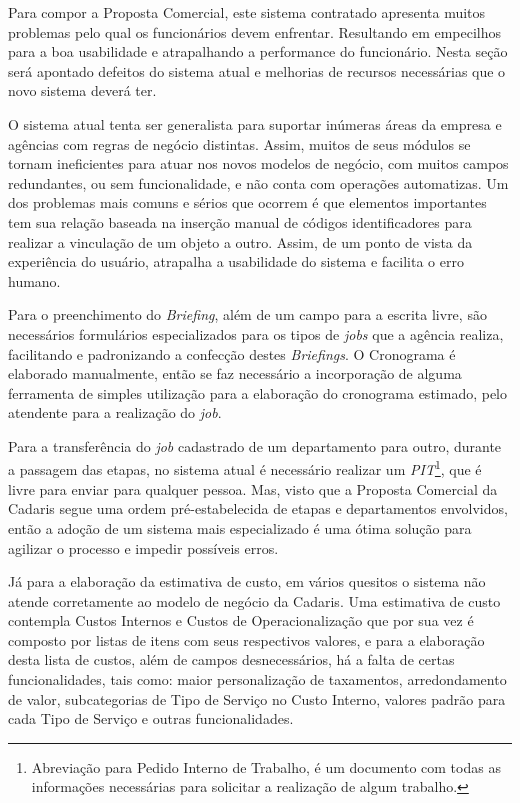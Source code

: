 \documentclass[
  12pt,				%
  openany,
  oneside,
  a4paper,			%
  english,			%
  brazil
]{article}
\numberwithin{figure}{section}
\numberwithin{table}{section}
\begin{document}
Para compor a Proposta Comercial, este sistema contratado apresenta muitos problemas pelo qual os funcionários devem enfrentar. Resultando em empecilhos para a boa usabilidade e atrapalhando a performance do funcionário. Nesta seção será apontado defeitos do sistema atual e melhorias de recursos necessárias que o novo sistema deverá ter.

O sistema atual tenta ser generalista para suportar inúmeras áreas da empresa e agências com regras de negócio distintas. Assim, muitos de seus módulos se tornam ineficientes para atuar nos novos modelos de negócio, com muitos campos redundantes, ou sem funcionalidade, e não conta com operações automatizas. Um dos problemas mais comuns e sérios que ocorrem é que elementos importantes tem sua relação baseada na inserção manual de códigos identificadores para realizar a vinculação de um objeto a outro. Assim, de um ponto de vista da experiência do usuário, atrapalha a usabilidade do sistema e facilita o erro humano.

Para o preenchimento do \textit{Briefing}, além de um campo para a escrita livre, são necessários formulários especializados para os tipos de \textit{jobs} que a agência realiza, facilitando e padronizando a confecção destes \textit{Briefings}. O Cronograma é elaborado manualmente, então se faz necessário a incorporação de alguma ferramenta de simples utilização para a elaboração do cronograma estimado, pelo atendente para a realização do \textit{job}.

Para a transferência do \textit{job} cadastrado de um departamento para outro, durante a passagem das etapas, no sistema atual é necessário realizar um \textit{PIT}\footnote{Abreviação para Pedido Interno de Trabalho, é um documento com todas as informações necessárias para solicitar a realização de algum trabalho.}, que é livre para enviar para qualquer pessoa. Mas, visto que a Proposta Comercial da Cadaris segue uma ordem pré-estabelecida de etapas e departamentos envolvidos, então a adoção de um sistema mais especializado é uma ótima solução para agilizar o processo e impedir possíveis erros.

Já para a elaboração da estimativa de custo, em vários quesitos o sistema não atende corretamente ao modelo de negócio da Cadaris. Uma estimativa de custo contempla Custos Internos e Custos de Operacionalização que por sua vez é composto por listas de itens com seus respectivos valores, e para a elaboração desta lista de custos, além de campos desnecessários, há a falta de certas funcionalidades, tais como: maior personalização de taxamentos, arredondamento de valor, subcategorias de Tipo de Serviço no Custo Interno, valores padrão para cada Tipo de Serviço e outras funcionalidades.
\end{document}

